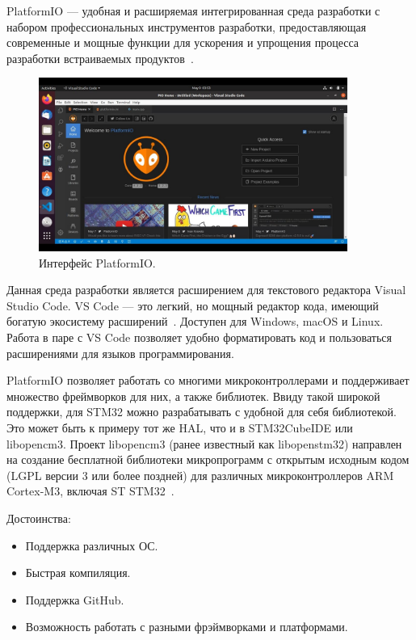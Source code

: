 	PlatformIO --- удобная и расширяемая интегрированная среда разработки с набором профессиональных инструментов разработки, предоставляющая современные и мощные функции для ускорения и упрощения процесса разработки встраиваемых продуктов~\cite{plio}.
	
	\begin{figure}[h]
    \centering
    \includegraphics[width=0.9\textwidth]{../image/plio.jpg}
    \caption{Интерфейс PlatformIO.}
	\end{figure}
	
	Данная среда разработки является расширением для текстового редактора Visual Studio Code. VS Code --- это легкий, но мощный редактор кода, имеющий богатую экосистему расширений~\cite{docsplio}. Доступен для Windows, macOS и Linux. Работа в паре с VS Code позволяет удобно форматировать код и пользоваться расширениями для языков программирования.
	
	PlatformIO позволяет работать со многими микроконтроллерами и поддерживает множество фреймворков для них, а также библиотек. Ввиду такой широкой поддержки, для STM32 можно разрабатывать с удобной для себя библиотекой. Это может быть к примеру тот же HAL, что и в STM32CubeIDE или libopencm3. Проект libopencm3 (ранее известный как libopenstm32) направлен на создание бесплатной библиотеки микропрограмм с открытым исходным кодом (LGPL версии 3 или более поздней) для различных микроконтроллеров ARM Cortex-M3, включая ST STM32~\cite{lcm3}.


	Достоинства:
	\begin{itemize}
		\item Поддержка различных ОС.
		\item Быстрая компиляция.
		\item Поддержка GitHub.
		\item Возможность работать с разными фрэймворками и платформами.
	\end{itemize}
	
